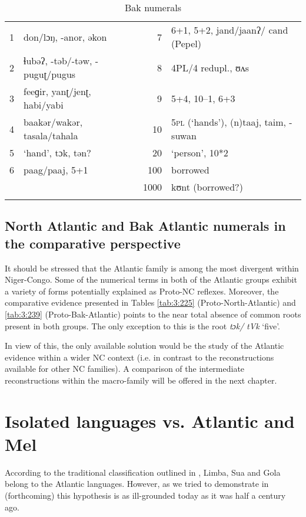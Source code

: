 \begin{table}
\caption{\label{tab:3:247}Bak numerals}


\begin{tabularx}{\textwidth}{ll@{}rQ}
\lsptoprule

1 & don/lɔŋ, -anor, əkon & 7 & 6+1, 5+2, jand/{jaanʔ/} cand (Pepel)\\
2 & ɬubəʔ, -təb/-təw, -puguʈ/pugus & 8 & 4PL/4 redupl., {ʊʌs}\\
3 & feeɡir, yanʈ/{jenʈ,} habi/yabi & 9 & 5+4, 10--1, 6+3\\
4 & baakər/wakər, tasala/tahala & 10 & 5\textsc{pl} (‘hands’), (n)taaj, taim, -suwan\\
5 & ‘hand’, tɔk, tən? & 20 & ‘person’, 10*2\\
6 & paag/paaj, 5+1 & 100 & borrowed\\
&  & 1000 & kʊnt (borrowed?)\\
\lspbottomrule
\end{tabularx}
\end{table}

 
\subsection{North Atlantic and Bak Atlantic numerals in the comparative perspective}%
It should be stressed that the Atlantic family is among the most divergent within Niger-Congo. Some of the numerical terms in both of the Atlantic groups exhibit a variety of forms potentially explained as Proto-NC reflexes. Moreover, the comparative evidence presented in Tables \ref{tab:3:225} (Proto-North-Atlantic) and \ref{tab:3:239} (Proto-Bak-Atlantic) points to the near total absence of common roots present in both groups. The only exception to this is the root \textit{tɔk/} \textit{tVk} ‘five’.

In view of this, the only available solution would be the study of the Atlantic evidence within a wider NC context (i.e. in contrast to the reconstructions available for other NC families). A comparison of the intermediate reconstructions within the macro-family will be offered in the next chapter.

\section{Isolated languages vs. Atlantic and Mel}%

According to the traditional classification outlined in \citealt{Sapir1971}, Limba, Sua and Gola belong to the Atlantic languages. However, as we tried to demonstrate in \citealt{PozdniakovSegerer2017} (forthcoming) this hypothesis is as ill-grounded today as it was half a century ago. 

